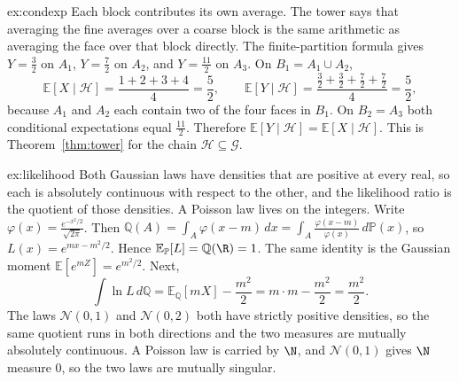 \begin{solution}{ex:condexp}
\idea Each block contributes its own average. The tower says that averaging the fine averages over a coarse block is the same arithmetic as averaging the face over that block directly.
\writeup The finite-partition formula gives $Y=\frac32$ on $A_1$, $Y=\frac72$ on $A_2$, and $Y=\frac{11}2$ on $A_3$. On $B_1=A_1\cup A_2$,
\[
\mathbb E[X\mid\mathcal H]=\frac{1+2+3+4}{4}=\frac52,\qquad
\mathbb E[Y\mid\mathcal H]=\frac{\frac32+\frac32+\frac72+\frac72}{4}=\frac52,
\]
because $A_1$ and $A_2$ each contain two of the four faces in $B_1$. On $B_2=A_3$ both conditional expectations equal $\frac{11}2$. Therefore $\mathbb E[Y\mid\mathcal H]=\mathbb E[X\mid\mathcal H]$. This is Theorem~\ref{thm:tower} for the chain $\mathcal H\subseteq\mathcal G$.
\end{solution}

\begin{solution}{ex:likelihood}
\idea Both Gaussian laws have densities that are positive at every real, so each is absolutely continuous with respect to the other, and the likelihood ratio is the quotient of those densities. A Poisson law lives on the integers.
\writeup Write $\varphi(x)=\frac{e^{-x^2/2}}{\sqrt{2\pi}}$. Then $\mathbb Q(A)=\int_A\varphi(x-m)\,dx=\int_A\frac{\varphi(x-m)}{\varphi(x)}\,d\mathbb P(x)$, so $L(x)=e^{mx-m^2/2}$. Hence $\mathbb E_{\mathbb P}[L]=\mathbb Q(\R)=1$. The same identity is the Gaussian moment $\mathbb E[e^{mZ}]=e^{m^2/2}$. Next,
\[
\int\ln L\,d\mathbb Q=\mathbb E_{\mathbb Q}[mX]-\frac{m^2}2=m\cdot m-\frac{m^2}2=\frac{m^2}2.
\]
The laws $\mathcal N(0,1)$ and $\mathcal N(0,2)$ both have strictly positive densities, so the same quotient runs in both directions and the two measures are mutually absolutely continuous. A Poisson law is carried by $\N$, and $\mathcal N(0,1)$ gives $\N$ measure $0$, so the two laws are mutually singular.
\end{solution}


